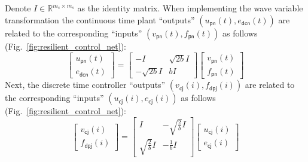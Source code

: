  Denote $I \in 
  \mathbb{R}^{m_s \times m_s}$ as the identity matrix.  When
  implementing the wave variable transformation the continuous time
  plant ``outputs''  $(u_{\mathsf{pn}}(t),e_{\mathsf{dcn}}(t))$ are related to the corresponding ``inputs''
  $(v_{\mathsf{pn}}(t),f_{\mathsf{pn}}(t))$ as follows (Fig.~\ref{fig:resilient_control_net}):
\begin{equation}
\label{E:plant_wave_transform}
\begin{bmatrix}
u_{\mathsf{pn}}(t)\\
e_{\mathsf{dcn}}(t)
\end{bmatrix} =
\begin{bmatrix}
-I & \sqrt{2b}I\\
-\sqrt{2b}I & bI
\end{bmatrix}
\begin{bmatrix}
v_{\mathsf{pn}}(t)\\
f_{\mathsf{pn}}(t)
\end{bmatrix}
\end{equation}
 Next, the discrete time controller ``outputs'' $(v_{\mathsf{cj}}(i),f_{\mathsf{dpj}}(i))$ are related to the
  corresponding ``inputs'' $(u_{\mathsf{cj}}(i),e_{\mathsf{cj}}(i))$ as follows (Fig.~\ref{fig:resilient_control_net}): 
\begin{equation}
\label{E:controller_wave_transform}
\begin{bmatrix}
v_{\mathsf{cj}}(i)\\
f_{\mathsf{dpj}}(i)
\end{bmatrix} =
\begin{bmatrix}
I & -\sqrt{\frac{2}{b}}I\\
\sqrt{\frac{2}{b}}I & -\frac{1}{b}I
\end{bmatrix}
\begin{bmatrix}
u_{\mathsf{cj}}(i)\\
e_{\mathsf{cj}}(i)
\end{bmatrix}
\end{equation}

